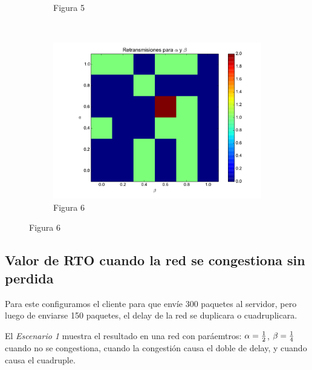 \begin{figure}[H]
\begin{subfigure}{0.32\textwidth}
		    \caption{Figura 5}
	    \end{subfigure}
	    ~
	    \begin{subfigure}{0.32\textwidth}
		    \includegraphics[width=1.0\textwidth]{imagenes/retransmisiones_300.pdf}
		    \caption{Figura 6}
	    \end{subfigure}
	
    \end{figure}    


    \subsection{Valor de RTO cuando la red se congestiona sin perdida}
        Para este configuramos el cliente para que env\'ie 300 paquetes al
        servidor, pero luego de enviarse 150 paquetes, el delay de la red
        se duplicara o cuadruplicara. 
        
        El \emph{Escenario 1} muestra el resultado en una red con
        par\'aemtros: $\alpha={{1}\over{2}}$, $\beta={{1}\over{4}}$
        cuando no se congestiona, cuando la congesti\'on causa el doble de
        delay, y cuando causa el cuadruple.
  
